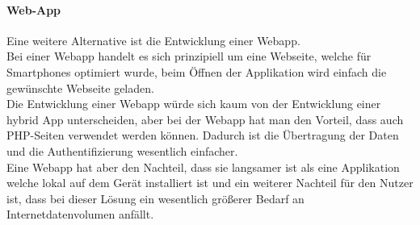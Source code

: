 \paragraph*{Web-App\\}

Eine weitere Alternative ist die Entwicklung einer Webapp.\\
Bei einer Webapp handelt es sich prinzipiell um eine Webseite, welche für Smartphones optimiert wurde, beim Öffnen der Applikation wird einfach die gewünschte Webseite geladen.\\
Die Entwicklung einer Webapp würde sich kaum von der Entwicklung einer hybrid App unterscheiden, aber bei der Webapp hat man den Vorteil, dass auch PHP-Seiten verwendet werden können. Dadurch ist die Übertragung der Daten und die Authentifizierung wesentlich einfacher.\\
Eine Webapp hat aber den Nachteil, dass sie langsamer ist als eine Applikation welche lokal auf dem Gerät installiert ist und ein weiterer Nachteil für den Nutzer ist, dass bei dieser Lösung ein wesentlich größerer Bedarf an Internetdatenvolumen anfällt.\\

